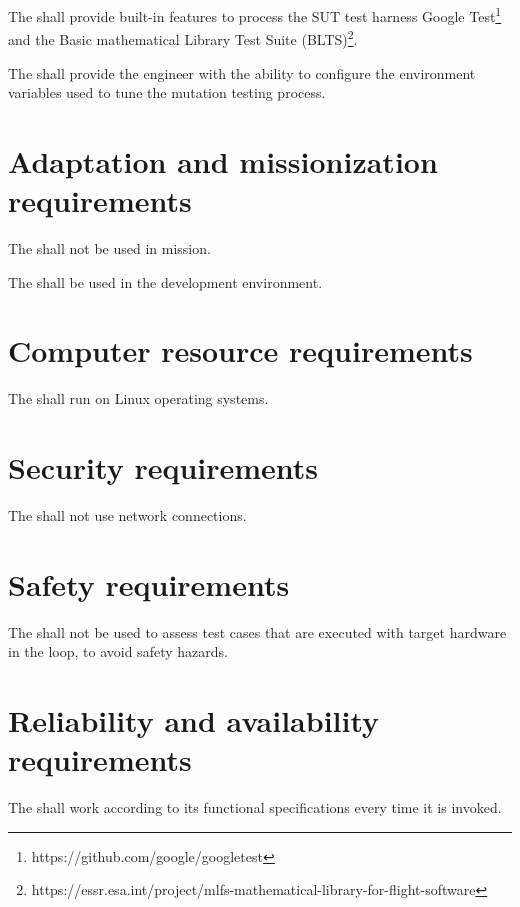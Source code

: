 \RQ{} The \FAQAS shall provide built-in features to process the SUT test harness Google Test\footnote{https://github.com/google/googletest} and the Basic mathematical Library Test Suite (BLTS)\footnote{https://essr.esa.int/project/mlfs-mathematical-library-for-flight-software}.


\RQ{} The \FAQAS shall provide the engineer with the ability to configure the environment variables used to tune the mutation testing process.



\section{Adaptation and missionization requirements}

\RQ{} The \FAQAS shall not be used in mission.

\RQ{} The \FAQAS shall be used in the development environment.




\section{Computer resource requirements}


\RQ{} The \FAQAS shall run on Linux operating systems.



\section{Security requirements }

\RQ{} The \FAQAS shall not use network connections.

\section{Safety requirements}

\RQ{} The \FAQAS shall not be used to assess test cases that are executed with target hardware in the loop, to avoid safety hazards.

\section{Reliability and availability requirements}

\RQ{} The \FAQAS shall work according to its functional specifications every time it is invoked.

